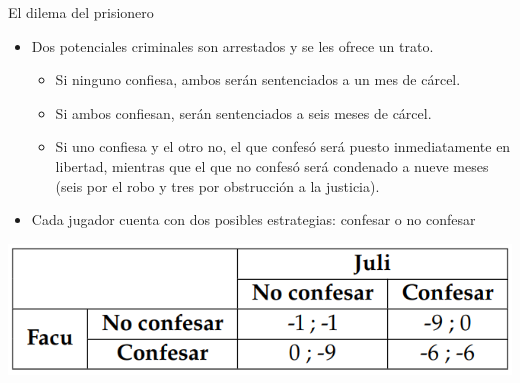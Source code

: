 \documentclass{beamer}
\begin{document}
\begin{frame}{El dilema del prisionero}
    \begin{itemize}
        \item Dos potenciales criminales son arrestados y se les ofrece un trato.
        \begin{itemize}
            \item Si ninguno confiesa, ambos serán sentenciados a un mes de cárcel.
            \item Si ambos confiesan, serán sentenciados a seis meses de cárcel.
            \item Si uno confiesa y el otro no, el que confesó será puesto inmediatamente en libertad, mientras que el que no confesó será condenado a nueve meses (seis por el robo y tres por obstrucción a la justicia).
        \end{itemize}
        \item Cada jugador cuenta con dos posibles estrategias: confesar o no confesar
    \end{itemize}
    \begin{center}
        \includegraphics[scale=0.6]{../Figures/T20.8.png}
    \end{center}
\end{frame}
\end{document}

